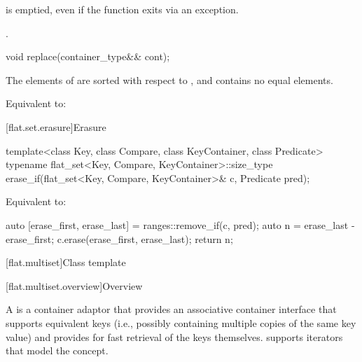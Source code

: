 \begin{itemdescr}
\pnum
\ensures
{} is emptied, even if the function exits via an exception.

\pnum
\returns
{}.
\end{itemdescr}

%
\begin{itemdecl}
void replace(container_type&& cont);
\end{itemdecl}

\begin{itemdescr}
\pnum
\expects
The elements of  are sorted with respect to , and
 contains no equal elements.

\pnum
\effects
Equivalent to: 
\end{itemdescr}

[flat.set.erasure]{Erasure}

%
\begin{itemdecl}
template<class Key, class Compare, class KeyContainer, class Predicate>
  typename flat_set<Key, Compare, KeyContainer>::size_type
    erase_if(flat_set<Key, Compare, KeyContainer>& c, Predicate pred);
\end{itemdecl}

\begin{itemdescr}
\pnum
\effects
Equivalent to:
\begin{codeblock}
auto [erase_first, erase_last] = ranges::remove_if(c, pred);
auto n = erase_last - erase_first;
c.erase(erase_first, erase_last);
return n;
\end{codeblock}
\end{itemdescr}

[flat.multiset]{Class template }

[flat.multiset.overview]{Overview}

\pnum
{}%
A  is a container adaptor
that provides an associative container interface
that supports equivalent keys
(i.e., possibly containing multiple copies of the same key value) and
provides for fast retrieval of the keys themselves.
 supports iterators that model the
 concept.

